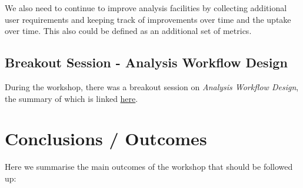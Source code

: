 \documentclass[a4paper,11pt]{article}
\begin{document}
We also need to continue to improve analysis facilities by collecting
additional user requirements and keeping track of improvements over time
and the uptake over time. This also could be defined as an additional
set of metrics.

\subsection{Breakout Session - Analysis Workflow
Design}\label{breakout-session---analysis-workflow-design}

During the workshop, there was a breakout session on \emph{Analysis
Workflow Design}, the summary of which is linked
\href{https://docs.google.com/document/d/116ITweumV9AKIBvMn-GcPQ4UQ--xvZLhAgtjlgGhZdc/edit?usp=sharing}{{here}}.

\hypertarget{conclusions-outcomes}{%
\section{Conclusions / Outcomes}\label{conclusions-outcomes}}

Here we summarise the main outcomes of the workshop that should be
followed up:
\end{document}
